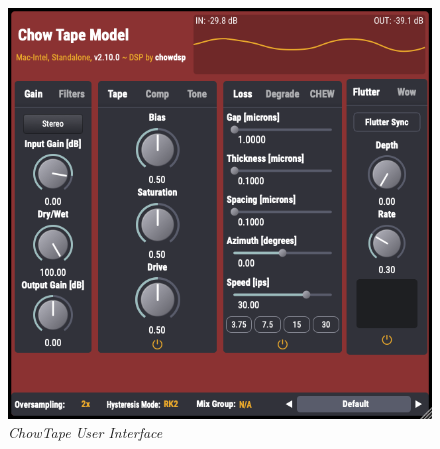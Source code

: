 \documentclass[landscape,twocolumn,a5paper]{manual}
\begin{document}
\begin{figure}[ht]
    \center
    \includegraphics[width=0.55\columnwidth]{../Plugin/Screenshots/full_gui.png}
    \caption{\label{full_gui}{\it ChowTape User Interface}}
\end{figure}
\end{document}
